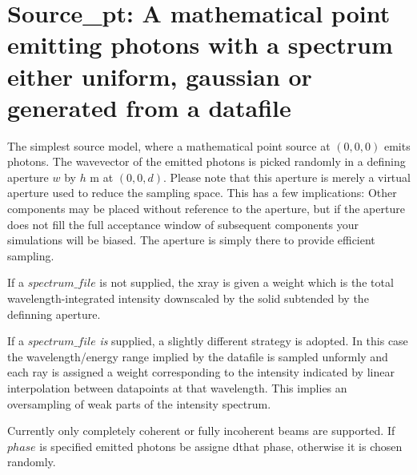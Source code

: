 \section{Source\_pt: A mathematical point emitting photons with a spectrum either uniform, gaussian or generated from a datafile}
\label{source-pt}

The simplest source model, where a mathematical point source at $(0,0,0)$ emits photons. The wavevector of the emitted photons
is picked randomly in a defining aperture $w$ by $h$ m at $(0,0,d)$. 
Please note that this aperture is merely a
virtual aperture used to reduce the sampling space. This has a few
implications: Other components may be placed without reference to the aperture,
but if the aperture does not fill the full acceptance window of subsequent
components your simulations will be biased. The aperture is simply there to provide efficient sampling.

If a $spectrum\_file$ is not supplied, the xray
is given a weight which is the total wavelength-integrated intensity downscaled
by the
solid subtended by the definning aperture.

If a $spectrum\_file$ \emph{is} supplied, a slightly different strategy is adopted. In this case the
wavelength/energy range implied by the datafile is sampled unformly and each ray is assigned
a weight corresponding to the intensity indicated by linear interpolation between datapoints
at that wavelength. This implies an oversampling of weak parts of the intensity spectrum.

Currently only completely coherent or fully incoherent beams are supported. If
$phase$ is specified emitted photons be assigne dthat phase, otherwise it is
chosen randomly.
